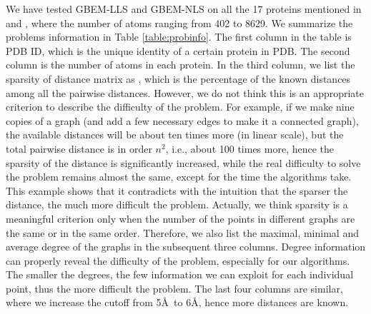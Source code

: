 \documentclass[a4paper,12pt]{article}
\begin{document}
We have tested GBEM-LLS and GBEM-NLS on all the 17 proteins mentioned in \cite{Biswas2008} and \cite{Sit2009}, where the number of atoms ranging from 402 to 8629. We summarize the problems information in Table \ref{table:probinfo}. The first column in the table is PDB ID, which is the unique identity of a certain protein in PDB. The second column is the number of atoms in each protein. In the third column, we list the sparsity of distance matrix as \cite{Biswas2008}, which is the percentage of the known distances among all the pairwise distances. However, we do not think this is an appropriate criterion to describe the difficulty of the problem. For example, if we make nine copies of a graph (and add a few necessary edges to make it a connected graph), the available distances will be about ten times more (in linear scale), but the total pairwise distance is in order $n^2$, i.e., about 100 times more, hence the sparsity of the distance is significantly increased, while the real difficulty to solve the problem remains almost the same, except for the time the algorithms take. This example shows that it contradicts with the intuition that the sparser the distance, the much more difficult the problem. Actually, we think sparsity is a meaningful criterion only when the number of the points in different graphs are the same or in the same order. Therefore, we also list the maximal, minimal and average degree of the graphs in the subsequent three columns. Degree information can properly reveal the difficulty of the problem, especially for our algorithms. The smaller the degrees, the few information we can exploit for each individual point, thus the more difficult the problem. The last four columns are similar, where we increase the cutoff from 5\AA ~to 6\AA, hence more distances are known.
\end{document}
